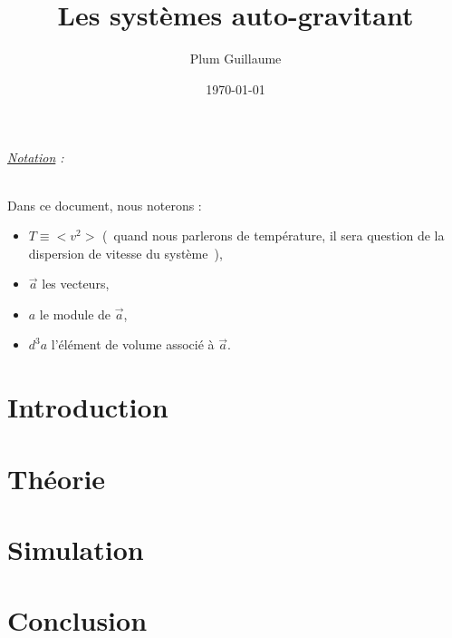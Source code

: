 \documentclass[a4paper,11pt,twoside,openright]{report}
\title{Les systèmes auto-gravitant}
\author{Plum Guillaume}
\date{\today}
\renewcommand{\(}{\ensuremath{\left(}}
\renewcommand{\)}{\ensuremath{\right)}}
\begin{document}
	\dominitoc
	

	\cleardoublepage

	\small \tableofcontents
	\listoffigures
	\listoftables

	\paragraph*{\underline{Notation} :}
	Dans ce document, nous noterons :
	\begin{itemize}
		\item $T \equiv <v^2>$ (~quand nous parlerons de température, il sera question de la dispersion de vitesse du système~),
		\item $\vec{a}$ les vecteurs,
		\item $a$ le module de $\vec{a}$,
		\item $d^3 a$ l'élément de volume associé à $\vec{a}$.
	\end{itemize}


	\pagestyle{fancy}
	\renewcommand{\chaptermark}[1]{\markboth{\MakeUppercase{\chaptername}\ \thechapter.\ #1}{}}


	\part{Introduction}
		

	\part{Théorie}
		


	\part{Simulation}
		

	\part*{Conclusion}
\end{document}
